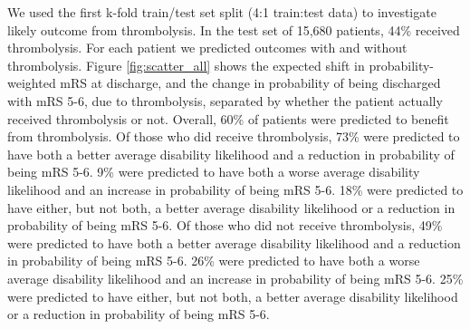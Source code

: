 We used the first k-fold train/test set split (4:1 train:test data) to investigate likely outcome from thrombolysis. In the test set of 15,680 patients, 44\% received thrombolysis. For each patient we predicted outcomes with and without thrombolysis. Figure \ref{fig:scatter_all} shows the expected shift in probability-weighted mRS at discharge, and the change in probability of being discharged with mRS 5-6, due to thrombolysis, separated by whether the patient actually received thrombolysis or not. Overall, 60\% of patients were predicted to benefit from thrombolysis. Of those who did receive thrombolysis, 73\% were predicted to have both a better average disability likelihood and a reduction in probability of being mRS 5-6. 9\% were predicted to have both a worse average disability likelihood and an increase in probability of being mRS 5-6. 18\% were predicted to have either, but not both, a better average disability likelihood or a reduction in probability of being mRS 5-6. Of those who did not receive thrombolysis, 49\% were predicted to have both a better average disability likelihood and a reduction in probability of being mRS 5-6. 26\% were predicted to have both a worse average disability likelihood and an increase in probability of being mRS 5-6. 25\% were predicted to have either, but not both, a better average disability likelihood or a reduction in probability of being mRS 5-6.

